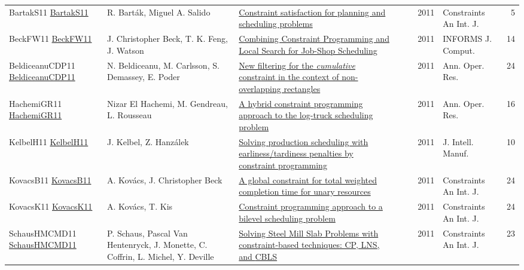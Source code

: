 {\begin{longtable}{p{3cm}p{6cm}p{7cm}rrrp{3cm}r}
BartakS11 \href{https://doi.org/10.1007/s10601-011-9109-4}{BartakS11} & R. Bart{\'{a}}k, Miguel A. Salido & \href{articles/BartakS11.pdf}{Constraint satisfaction for planning and scheduling problems} &  & \cite{BartakS11} & 2011 & Constraints An Int. J. & 5\\
BeckFW11 \href{https://doi.org/10.1287/ijoc.1100.0388}{BeckFW11} & J. Christopher Beck, T. K. Feng, J. Watson & \href{}{Combining Constraint Programming and Local Search for Job-Shop Scheduling} &  & \cite{BeckFW11} & 2011 & {INFORMS} J. Comput. & 14\\
BeldiceanuCDP11 \href{https://doi.org/10.1007/s10479-010-0731-0}{BeldiceanuCDP11} & N. Beldiceanu, M. Carlsson, S. Demassey, E. Poder & \href{articles/BeldiceanuCDP11.pdf}{New filtering for the \emph{cumulative} constraint in the context of non-overlapping rectangles} &  & \cite{BeldiceanuCDP11} & 2011 & Ann. Oper. Res. & 24\\
HachemiGR11 \href{https://doi.org/10.1007/s10479-010-0698-x}{HachemiGR11} & Nizar El Hachemi, M. Gendreau, L. Rousseau & \href{articles/HachemiGR11.pdf}{A hybrid constraint programming approach to the log-truck scheduling problem} &  & \cite{HachemiGR11} & 2011 & Ann. Oper. Res. & 16\\
KelbelH11 \href{https://doi.org/10.1007/s10845-009-0318-2}{KelbelH11} & J. Kelbel, Z. Hanz{\'{a}}lek & \href{articles/KelbelH11.pdf}{Solving production scheduling with earliness/tardiness penalties by constraint programming} &  & \cite{KelbelH11} & 2011 & J. Intell. Manuf. & 10\\
KovacsB11 \href{https://doi.org/10.1007/s10601-009-9088-x}{KovacsB11} & A. Kov{\'{a}}cs, J. Christopher Beck & \href{articles/KovacsB11.pdf}{A global constraint for total weighted completion time for unary resources} &  & \cite{KovacsB11} & 2011 & Constraints An Int. J. & 24\\
KovacsK11 \href{https://doi.org/10.1007/s10601-010-9102-3}{KovacsK11} & A. Kov{\'{a}}cs, T. Kis & \href{articles/KovacsK11.pdf}{Constraint programming approach to a bilevel scheduling problem} &  & \cite{KovacsK11} & 2011 & Constraints An Int. J. & 24\\
SchausHMCMD11 \href{https://doi.org/10.1007/s10601-010-9100-5}{SchausHMCMD11} & P. Schaus, Pascal Van Hentenryck, J. Monette, C. Coffrin, L. Michel, Y. Deville & \href{articles/SchausHMCMD11.pdf}{Solving Steel Mill Slab Problems with constraint-based techniques: CP, LNS, and {CBLS}} &  & \cite{SchausHMCMD11} & 2011 & Constraints An Int. J. & 23\\

\end{longtable}}
